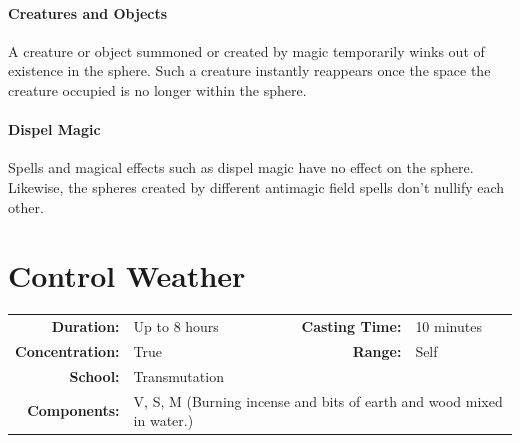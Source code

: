 \documentclass[12pt]{memoir}
\begin{document}
\paragraph{Creatures and Objects} A creature or object summoned or created by magic temporarily winks out of existence in the sphere. Such a creature instantly reappears once the space the creature occupied is no longer within the sphere. \paragraph{Dispel Magic} Spells and magical effects such as dispel magic have no effect on the sphere. Likewise, the spheres created by different antimagic field spells don't nullify each other.

\newpage
\section*{Control Weather}

{
\small\centering\vspace{-6pt}
\begin{tabular}{rlrl}
\toprule

\textbf{Duration:} & Up to 8 hours &
\textbf{Casting Time:} & 10 minutes \\
\textbf{Concentration:} & True &
\textbf{Range:} & Self \\
\textbf{School:} & Transmutation \\
\textbf{Components:} & \multicolumn{3}{p{0.7\textwidth}}{V, S, M (Burning incense and bits of earth and wood mixed in water.)}\\

\bottomrule
\end{tabular}
}
\end{document}
